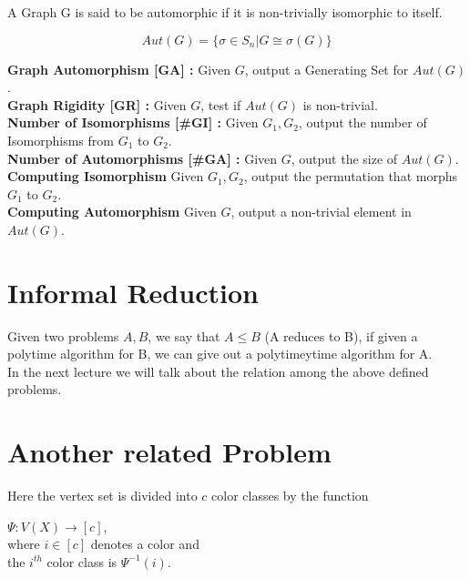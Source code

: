 \begin{definition}[Automorphism]
A Graph G is said to be automorphic if it is non-trivially isomorphic to itself.
\end{definition}

\begin{definition}[$Aut(G)$]
\[Aut(G) = \{\sigma \in S_n | G \cong \sigma(G)\}\]
\end{definition}

\textbf{Graph Automorphism [GA] :} Given $G$, output a Generating Set for $Aut(G)$.\\

\textbf{Graph Rigidity [GR] :} Given $G$, test if $Aut(G)$ is non-trivial.\\

\textbf{Number of Isomorphisms [\#GI] :} Given $G_1,G_2$, output the number of Isomorphisms from $G_1$ to $G_2$.\\

\textbf{Number of Automorphisms [\#GA] :} Given $G$, output the size of $Aut(G)$.\\

\textbf{Computing Isomorphism} Given $G_1,G_2$, output the permutation that morphs $G_1$ to $G_2$.\\

\textbf{Computing Automorphism} Given $G$, output a non-trivial element in $Aut(G)$.\\

\section{Informal Reduction} 
Given two problems $A,B$, we say that $A \le B$ (A reduces to B), if given a polytime algorithm for B, we can give out a polytimeytime algorithm for A.\\ 


In the next lecture we will talk about the relation among the above defined problems.




\section{Another related Problem}
Here the vertex set is divided into $c$ color classes by the function 
\begin{center} $\Psi : V(X) \rightarrow [c]$,\\
 where $i \in [c]$ denotes a color and\\
 the $i^{th}$ color class is $\Psi^{-1}(i)$.\end{center}\\

